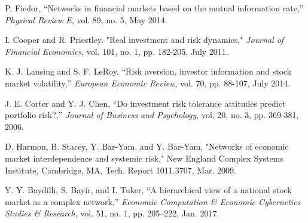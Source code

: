 \documentclass[letterpaper, 11 pt, proceedings]{IEEEtran}
\begin{document}
\begin{thebibliography}{99}
		P. Fiedor, “Networks in financial markets based on the mutual information rate,” \textit{Physical Review E}, vol. 89, no. 5, May 2014. %
		
		I. Cooper and R. Priestley. "Real investment and risk dynamics," \textit{Journal of Financial Economics}, vol. 101, no. 1, pp. 182-205, July 2011.
		
		K. J. Lansing and S. F. LeRoy, “Risk aversion, investor information and stock market volatility,” \textit{European Economic Review}, vol. 70, pp. 88-107, July 2014. 
		
		J. E. Corter and Y. J. Chen, “Do investment risk tolerance attitudes predict portfolio risk?,” \textit{Journal of Business and Psychology}, vol. 20, no. 3, pp. 369-381, 2006.
		
		D. Harmon, B. Stacey, Y. Bar-Yam, and Y. Bar-Yam, "Networks of economic market interdependence and systemic risk," New England Complex Systems Institute, Cambridge, MA, Tech. Report 1011.3707, Mar. 2009.
		
		Y. Y. Baydilli, S. Bayir, and I. Tuker, “A hierarchical view of a national stock market as a complex network,” \textit{Economic Computation \& Economic Cybernetics Studies \& Research}, vol. 51, no. 1, pp. 205–222, Jan. 2017.
		
	\end{thebibliography}

		

\end{document}
